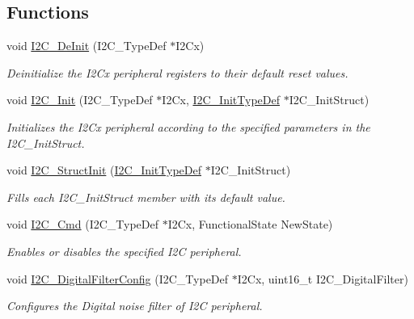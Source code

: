\subsection*{Functions}
\begin{DoxyCompactItemize}
\item 
void \mbox{\hyperlink{group___i2_c_ga2ee214364603059ad5d9089f749f5bfd}{I2\+C\+\_\+\+De\+Init}} (I2\+C\+\_\+\+Type\+Def $\ast$I2\+Cx)
\begin{DoxyCompactList}\small\item\em Deinitialize the I2\+Cx peripheral registers to their default reset values. \end{DoxyCompactList}\item 
void \mbox{\hyperlink{group___i2_c_gaac29465bca70fbc91c2f922ab67bb88e}{I2\+C\+\_\+\+Init}} (I2\+C\+\_\+\+Type\+Def $\ast$I2\+Cx, \mbox{\hyperlink{struct_i2_c___init_type_def}{I2\+C\+\_\+\+Init\+Type\+Def}} $\ast$I2\+C\+\_\+\+Init\+Struct)
\begin{DoxyCompactList}\small\item\em Initializes the I2\+Cx peripheral according to the specified parameters in the I2\+C\+\_\+\+Init\+Struct. \end{DoxyCompactList}\item 
void \mbox{\hyperlink{group___i2_c_ga08582aca6d7d7910cd5cbff0d9def350}{I2\+C\+\_\+\+Struct\+Init}} (\mbox{\hyperlink{struct_i2_c___init_type_def}{I2\+C\+\_\+\+Init\+Type\+Def}} $\ast$I2\+C\+\_\+\+Init\+Struct)
\begin{DoxyCompactList}\small\item\em Fills each I2\+C\+\_\+\+Init\+Struct member with its default value. \end{DoxyCompactList}\item 
void \mbox{\hyperlink{group___i2_c_ga7e1323c9133c2cb424dfb5b10b7d2f0b}{I2\+C\+\_\+\+Cmd}} (I2\+C\+\_\+\+Type\+Def $\ast$I2\+Cx, Functional\+State New\+State)
\begin{DoxyCompactList}\small\item\em Enables or disables the specified I2C peripheral. \end{DoxyCompactList}\item 
void \mbox{\hyperlink{group___i2_c_ga90b0815858cc14266d2957495fd7e105}{I2\+C\+\_\+\+Digital\+Filter\+Config}} (I2\+C\+\_\+\+Type\+Def $\ast$I2\+Cx, uint16\+\_\+t I2\+C\+\_\+\+Digital\+Filter)
\begin{DoxyCompactList}\small\item\em Configures the Digital noise filter of I2C peripheral. \end{DoxyCompactList}\item 

\end{DoxyCompactItemize}

